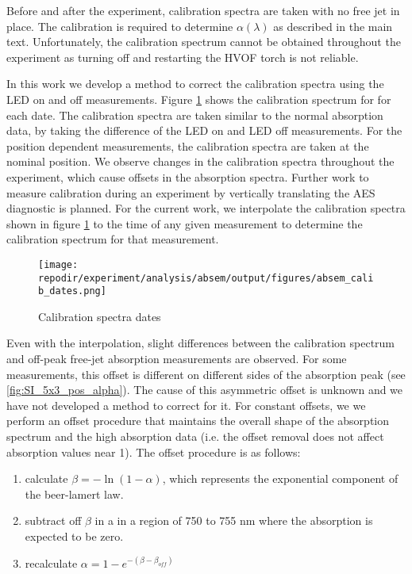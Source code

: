 Before and after the experiment, calibration spectra are taken with no free jet in place. The calibration is required to determine $\alpha(\lambda)$ as described in the main text. Unfortunately, the calibration spectrum cannot be obtained throughout the experiment as turning off and restarting the HVOF torch is not reliable.  

In this work we develop a method to correct the calibration spectra using the LED on and off measurements. Figure \ref{fig:SI_absem_calib_dates} shows the calibration spectrum for for each date. The calibration spectra are taken similar to the normal absorption data, by taking the difference of the LED on and LED off measurements. For the position dependent measurements, the calibration spectra are taken at the nominal position. We observe changes in the calibration spectra throughout the experiment, which cause offsets in the absorption spectra. Further work to measure calibration during an experiment by vertically translating the AES diagnostic is planned. For the current work, we interpolate the calibration spectra shown in figure \ref{fig:SI_absem_calib_dates} to the time of any given measurement to determine the calibration spectrum for that measurement. 

\begin{figure}[]
    \centering
    \texttt{[image: \\repodir/experiment/analysis/absem/output/figures/absem\_calib\_dates.png]}
    \caption{Calibration spectra dates}
    \label{fig:SI_absem_calib_dates}
\end{figure}

Even with the interpolation, slight differences between the calibration spectrum and off-peak free-jet absorption measurements are observed. For some measurements, this offset is different on different sides of the absorption peak (see \ref{fig:SI_5x3_pos_alpha}). The cause of this asymmetric offset is unknown and we have not developed a method to correct for it. For constant offsets, we we perform an offset procedure that maintains the overall shape of the absorption spectrum and the high absorption data (i.e. the offset removal does not affect absorption values near 1). The offset procedure is as follows:

\begin{enumerate}
    \item calculate $\beta = -\ln(1 - \alpha)$, which represents the exponential component of the beer-lamert law. 
    \item subtract off $\beta$ in a in a region of 750 to 755 nm where the absorption is expected to be zero.
    \item recalculate $\alpha = 1 - e^{- (\beta - \beta_{off})}$ 
\end{enumerate}

